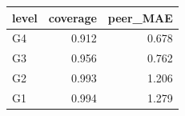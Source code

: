 \begin{tabular}{lrr}
\toprule
level & coverage & peer_MAE \\
\midrule
G4 & 0.912 & 0.678 \\
G3 & 0.956 & 0.762 \\
G2 & 0.993 & 1.206 \\
G1 & 0.994 & 1.279 \\
\bottomrule
\end{tabular}
